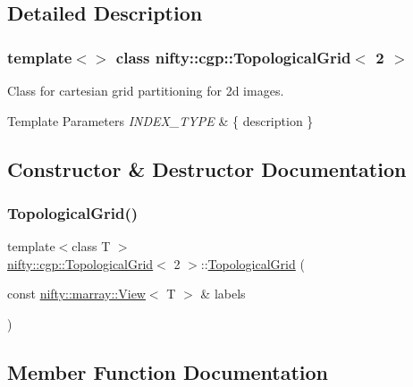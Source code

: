 \subsection{Detailed Description}
\subsubsection*{template$<$$>$\newline
class nifty\+::cgp\+::\+Topological\+Grid$<$ 2 $>$}

Class for cartesian grid partitioning for 2d images. 


\begin{DoxyTemplParams}{Template Parameters}
{\em I\+N\+D\+E\+X\+\_\+\+T\+Y\+PE} & \{ description \} \\
\hline
\end{DoxyTemplParams}


\subsection{Constructor \& Destructor Documentation}
\mbox{\label{classnifty_1_1cgp_1_1TopologicalGrid_3_012_01_4_a7f422c1535a4d760394676b59a1999fd}} 
\subsubsection{\texorpdfstring{Topological\+Grid()}{TopologicalGrid()}}
{\footnotesize\ttfamily template$<$class T $>$ \\
\hyperlink{classnifty_1_1cgp_1_1TopologicalGrid}{nifty\+::cgp\+::\+Topological\+Grid}$<$ 2 $>$\+::\hyperlink{classnifty_1_1cgp_1_1TopologicalGrid}{Topological\+Grid} (\begin{DoxyParamCaption}\item[{const \hyperlink{classandres_1_1View}{nifty\+::marray\+::\+View}$<$ T $>$ \&}]{labels }\end{DoxyParamCaption})\hspace{0.3cm}{\ttfamily [inline]}}



\subsection{Member Function Documentation}
\mbox{\label{classnifty_1_1cgp_1_1TopologicalGrid_3_012_01_4_ac34e6a5f4e42bb18925dd06c87c37afa}} 
